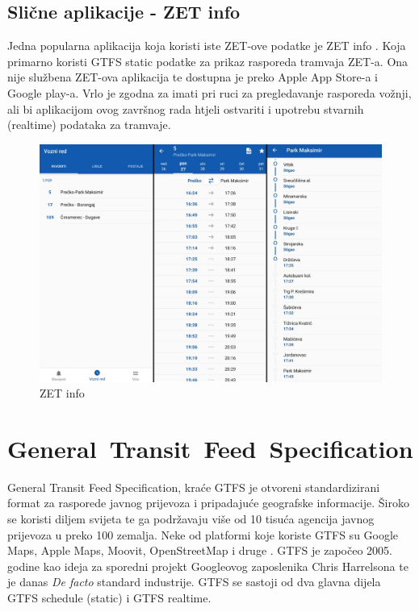 \documentclass[zavrsnirad]{fer}
\begin{document}
\section{Slične aplikacije - ZET info}
Jedna popularna aplikacija koja koristi iste ZET-ove podatke je ZET info \cite{ZET-info}. Koja primarno koristi GTFS static podatke za prikaz rasporeda tramvaja ZET-a. Ona nije službena ZET-ova aplikacija te dostupna je preko Apple App Store-a i Google play-a. Vrlo je zgodna za imati pri ruci za pregledavanje rasporeda vožnji, ali bi aplikacijom ovog završnog rada htjeli ostvariti i upotrebu stvarnih (realtime) podataka za tramvaje.

\begin{figure}[H]
	\centering
	\includegraphics[width=0.9\linewidth]{Figures/zetinfo.png} 
	\caption{ZET info}
	\label{slk:zet-info}
\end{figure}

\newpage
\chapter{\mbox{General Transit Feed Specification}}
\label{sec:GTFS}

General Transit Feed Specification, kraće GTFS je otvoreni standardizirani format za rasporede
javnog prijevoza i pripadajuće geografske informacije. Široko se koristi diljem svijeta te ga
podržavaju više od 10 tisuća agencija javnog prijevoza u preko 100 zemalja. Neke od platformi koje
koriste GTFS su Google Maps, Apple Maps, Moovit, OpenStreetMap i druge \cite{GTFS}. GTFS je započeo 2005. godine kao ideja za sporedni projekt Googleovog zaposlenika Chris Harrelsona te je danas \textit{De facto} standard industrije. GTFS se sastoji od dva glavna dijela GTFS schedule (static) i GTFS realtime.
\end{document}
